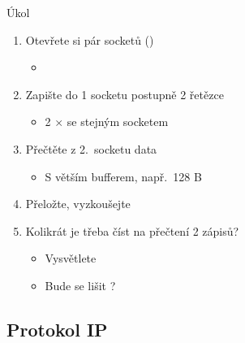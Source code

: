 \begin{frame}{Úkol}

  \begin{enumerate}
    \item Otevřete si pár socketů ()
    \begin{itemize}
      \item {}
    \end{itemize}

    \item Zapište do 1 socketu postupně 2 řetězce
    \begin{itemize}
      \item 2 $\times$  se stejným socketem
    \end{itemize}

    \item Přečtěte z 2.\ socketu data
    \begin{itemize}
      \item S větším bufferem, např.\ 128 B
    \end{itemize}

    \item Přeložte, vyzkoušejte

    \item Kolikrát je třeba číst na přečtení 2 zápisů?
    \begin{itemize}
      \item Vysvětlete
      \item Bude se lišit ?
    \end{itemize}
  \end{enumerate}

\end{frame}

\subsection*{Protokol IP}
\frame{\subsectionpage}

\fi

